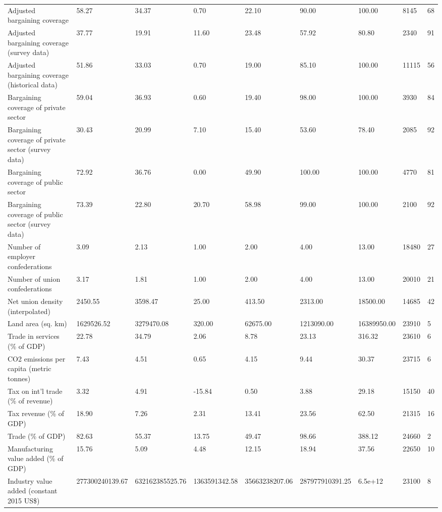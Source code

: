 \begin{longtable}{lllllllll}
Adjusted bargaining coverage & 58.27 & 34.37 & 0.70 & 22.10 & 90.00 & 100.00 & 8145 & 68\\
Adjusted bargaining coverage (survey data) & 37.77 & 19.91 & 11.60 & 23.48 & 57.92 & 80.80 & 2340 & 91\\
\addlinespace
Adjusted bargaining coverage (historical data) & 51.86 & 33.03 & 0.70 & 19.00 & 85.10 & 100.00 & 11115 & 56\\
Bargaining coverage of private sector & 59.04 & 36.93 & 0.60 & 19.40 & 98.00 & 100.00 & 3930 & 84\\
Bargaining coverage of private sector (survey data) & 30.43 & 20.99 & 7.10 & 15.40 & 53.60 & 78.40 & 2085 & 92\\
Bargaining coverage of public sector & 72.92 & 36.76 & 0.00 & 49.90 & 100.00 & 100.00 & 4770 & 81\\
Bargaining coverage of public sector (survey data) & 73.39 & 22.80 & 20.70 & 58.98 & 99.00 & 100.00 & 2100 & 92\\
\addlinespace
Number of employer confederations & 3.09 & 2.13 & 1.00 & 2.00 & 4.00 & 13.00 & 18480 & 27\\
Number of union confederations & 3.17 & 1.81 & 1.00 & 2.00 & 4.00 & 13.00 & 20010 & 21\\
Net union density (interpolated) & 2450.55 & 3598.47 & 25.00 & 413.50 & 2313.00 & 18500.00 & 14685 & 42\\
Land area (sq. km) & 1629526.52 & 3279470.08 & 320.00 & 62675.00 & 1213090.00 & 16389950.00 & 23910 & 5\\
Trade in services (\% of GDP) & 22.78 & 34.79 & 2.06 & 8.78 & 23.13 & 316.32 & 23610 & 6\\
\addlinespace
CO2 emissions per capita (metric tonnes) & 7.43 & 4.51 & 0.65 & 4.15 & 9.44 & 30.37 & 23715 & 6\\
Tax on int'l trade (\% of revenue) & 3.32 & 4.91 & -15.84 & 0.50 & 3.88 & 29.18 & 15150 & 40\\
Tax revenue (\% of GDP) & 18.90 & 7.26 & 2.31 & 13.41 & 23.56 & 62.50 & 21315 & 16\\
Trade (\% of GDP) & 82.63 & 55.37 & 13.75 & 49.47 & 98.66 & 388.12 & 24660 & 2\\
Manufacturing value added (\% of GDP) & 15.76 & 5.09 & 4.48 & 12.15 & 18.94 & 37.56 & 22650 & 10\\
\addlinespace
Industry value added (constant 2015 US\$) & 277300240139.67 & 632162385525.76 & 1363591342.58 & 35663238207.06 & 287977910391.25 & 6.5e+12 & 23100 & 8\\

\end{longtable}
